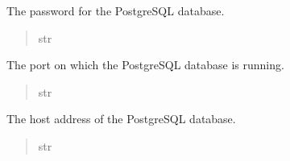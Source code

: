 \documentclass[letterpaper,10pt,english]{sphinxmanual}
\begin{document}
\begin{fulllineitems}
\begin{fulllineitems}
\begin{quote}
\begin{description}
\end{description}\end{quote}

\end{fulllineitems}


\begin{fulllineitems}
\label{\detokenize{config:config.db.DataBaseSettings.POSTGRES_PASSWORD}}
\pysigstartsignatures
{}
\pysigstopsignatures
\sphinxAtStartPar
The password for the PostgreSQL database.
\begin{quote}\begin{description}
\sphinxAtStartPar
str

\end{description}\end{quote}

\end{fulllineitems}


\begin{fulllineitems}
\label{\detokenize{config:config.db.DataBaseSettings.POSTGRES_PORT}}
\pysigstartsignatures
{}
\pysigstopsignatures
\sphinxAtStartPar
The port on which the PostgreSQL database is running.
\begin{quote}\begin{description}
\sphinxAtStartPar
str

\end{description}\end{quote}

\end{fulllineitems}


\begin{fulllineitems}
\label{\detokenize{config:config.db.DataBaseSettings.POSTGRES_HOST}}
\pysigstartsignatures
{}
\pysigstopsignatures
\sphinxAtStartPar
The host address of the PostgreSQL database.
\begin{quote}\begin{description}
\sphinxAtStartPar
str


\end{description}
\end{quote}
\end{fulllineitems}
\end{fulllineitems}
\end{document}
